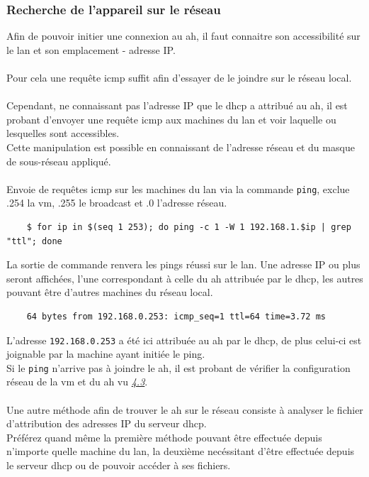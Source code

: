 \documentclass[a4paper]{article}
\begin{document}
\subsubsection{Recherche de l'appareil sur le réseau}
\label{sec:iprpi}
Afin de pouvoir initier une connexion au \acrshort{ah}, il faut connaitre son accessibilité sur le \gls{lan} et son emplacement - adresse IP.\\\\Pour cela une requête \gls{icmp} suffit afin d'essayer de le joindre sur le réseau local.\\\\Cependant, ne connaissant pas l'adresse IP que le \gls{dhcp} a attribué au \acrshort{ah}, il est probant d'envoyer une requête \gls{icmp} aux machines du \gls{lan} et voir laquelle ou lesquelles sont accessibles.\\Cette manipulation est possible en connaissant de l'adresse réseau et du masque de sous-réseau appliqué.\\\\Envoie de requêtes \gls{icmp} sur les machines du \gls{lan} via la commande \verb|ping|, exclue .254 la \acrshort{vm}, .255 le broadcast et .0 l'adresse réseau.
\begin{lstlisting}
    $ for ip in $(seq 1 253); do ping -c 1 -W 1 192.168.1.$ip | grep "ttl"; done
\end{lstlisting}
La sortie de commande renvera les pings réussi sur le \gls{lan}. Une adresse IP ou plus seront affichées, l'une correspondant à celle du \acrshort{ah} attribuée par le \gls{dhcp}, les autres pouvant être d'autres machines du réseau local. 
\begin{lstlisting}
    64 bytes from 192.168.0.253: icmp_seq=1 ttl=64 time=3.72 ms
\end{lstlisting}
L'adresse \verb|192.168.0.253| a été ici attribuée au \acrshort{ah} par le \gls{dhcp}, de plus celui-ci est joignable par la machine ayant initiée le ping.\\Si le \verb|ping| n'arrive pas à joindre le \acrshort{ah}, il est probant de vérifier la configuration réseau de la \acrshort{vm} et du \acrshort{ah} vu \hyperref[sec:ici]{\textit{4.3}}.\\\\Une autre méthode afin de trouver le \acrshort{ah} sur le réseau consiste à analyser le fichier d'attribution des adresses IP du serveur \gls{dhcp}.\\Préférez quand même la première méthode pouvant être effectuée depuis n'importe quelle machine du \gls{lan}, la deuxième necéssitant d'être effectuée depuis le serveur \gls{dhcp} ou de pouvoir accéder à ses fichiers.
\end{document}
